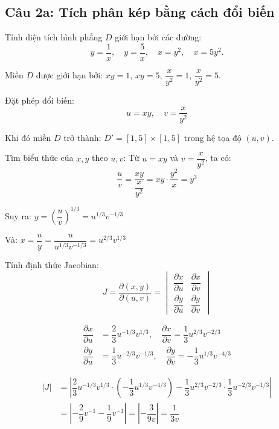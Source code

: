 \subsection*{Câu 2a: Tích phân kép bằng cách đổi biến}

\begin{questionbox}
Tính diện tích hình phẳng $D$ giới hạn bởi các đường:
\[
    y = \dfrac{1}{x}, \quad y = \dfrac{5}{x}, \quad x = y^2, \quad x = 5y^2.
\]
\end{questionbox}

\begin{solution}
Miền $D$ được giới hạn bởi: $xy = 1$, $xy = 5$, $\dfrac{x}{y^2} = 1$, $\dfrac{x}{y^2} = 5$.

\textit{} Đặt phép đổi biến:
\[
    u = xy, \quad v = \dfrac{x}{y^2}
\]

Khi đó miền $D$ trở thành: $D' = [1, 5] \times [1, 5]$ trong hệ tọa độ $(u, v)$.

\textit{} Tìm biểu thức của $x, y$ theo $u, v$:
Từ $u = xy$ và $v = \dfrac{x}{y^2}$, ta có:
\[
    \dfrac{u}{v} = \dfrac{xy}{\dfrac{x}{y^2}} = xy \cdot \dfrac{y^2}{x} = y^3
\]

Suy ra: $y = \left(\dfrac{u}{v}\right)^{1/3} = u^{1/3}v^{-1/3}$

Và: $x = \dfrac{u}{y} = \dfrac{u}{u^{1/3}v^{-1/3}} = u^{2/3}v^{1/3}$

\textit{} Tính định thức Jacobian:
\[
    J = \dfrac{\partial(x,y)}{\partial(u,v)} = \begin{vmatrix}
        \dfrac{\partial x}{\partial u} & \dfrac{\partial x}{\partial v} \\
        \dfrac{\partial y}{\partial u} & \dfrac{\partial y}{\partial v}
    \end{vmatrix}
\]

\begin{align*}
    \dfrac{\partial x}{\partial u} &= \dfrac{2}{3}u^{-1/3}v^{1/3}, \quad 
    \dfrac{\partial x}{\partial v} = \dfrac{1}{3}u^{2/3}v^{-2/3} \\
    \dfrac{\partial y}{\partial u} &= \dfrac{1}{3}u^{-2/3}v^{-1/3}, \quad 
    \dfrac{\partial y}{\partial v} = -\dfrac{1}{3}u^{1/3}v^{-4/3}
\end{align*}

\begin{align*}
    |J| &= \left| \dfrac{2}{3}u^{-1/3}v^{1/3} \cdot \left(-\dfrac{1}{3}u^{1/3}v^{-4/3}\right) - \dfrac{1}{3}u^{2/3}v^{-2/3} \cdot \dfrac{1}{3}u^{-2/3}v^{-1/3} \right| \\
    &= \left| -\dfrac{2}{9}v^{-1} - \dfrac{1}{9}v^{-1} \right| = \left| -\dfrac{3}{9v} \right| = \dfrac{1}{3v}
\end{align*}


\end{solution}

